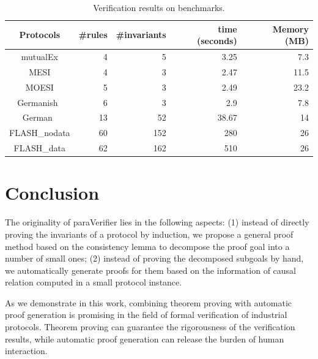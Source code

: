 \documentclass[final]{IEEEtran}
\begin{document}
\begin{table}[!t]
\centering
\caption{\label{Summarization of experiment results}Verification results on benchmarks.}
\begin{tabular}{|c|r|r|r|r|}
\hline
Protocols &  \#rules & \#invariants & time (seconds) & Memory (MB) \\
\hline\hline
mutualEx & 4& 5 & 3.25 & 7.3  \\
\hline
MESI & 4& 3 & 2.47 & 11.5  \\
\hline
MOESI &  5& 3 &2.49 & 23.2  \\
\hline
Germanish~\cite{cubicle2011}  & 6&3&2.9 & 7.8   \\
\hline
German~\cite{Chou2004} & 13 & 52 & 38.67 & 14  \\
\hline
FLASH\_nodata & 60 & 152 & 280 & 26  \\
\hline
FLASH\_data & 62 & 162 & 510 & 26  \\
\hline
\end{tabular}
\end{table}

\section{Conclusion }\label{sec:conclusion}
The originality of {\sf paraVerifier} lies in the following aspects:
(1) instead of directly proving the invariants of a protocol by induction, we propose a general
proof method based on the consistency lemma to decompose the proof goal into a number of small ones;
(2) instead of proving the decomposed subgoals by hand,
we automatically generate proofs for them based on the information of causal relation computed in a small protocol instance.%

As we demonstrate in this work, combining theorem proving with
automatic proof generation is promising in the field of formal
verification of industrial protocols. Theorem proving can guarantee the rigorousness of the verification results,
while automatic proof generation can release the burden of human interaction.

%


\end{document}

